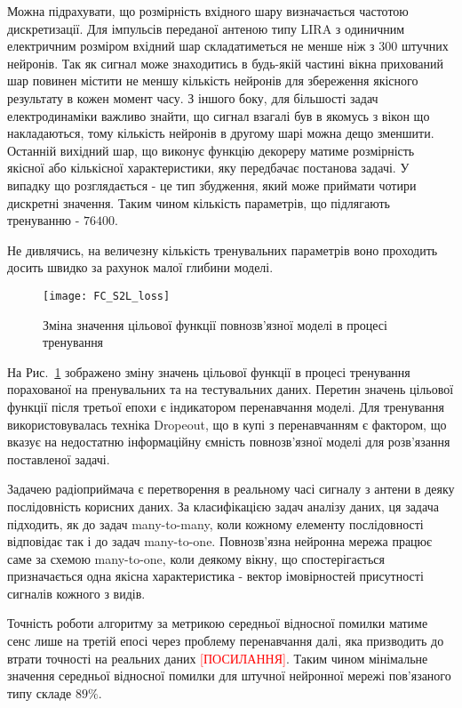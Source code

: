 Можна підрахувати, що розмірність вхідного шару визначається частотою 
дискретизації. Для імпульсів переданої антеною типу LIRA з одиничним 
електричним розміром вхідний шар складатиметься не менше ніж з 300 штучних 
нейронів. Так як сигнал може знаходитись в будь-якій частині вікна прихований 
шар повинен містити не меншу кількість нейронів для збереження якісного 
результату в кожен момент часу. З іншого боку, для більшості задач 
електродинаміки важливо знайти, що сигнал взагалі був в якомусь з вікон
що накладаються, тому кількість нейронів в другому шарі можна дещо зменшити.
Останній вихідний шар, що виконує функцію декореру матиме розмірність 
якісної або кількісної характеристики, яку передбачає постанова задачі.
У випадку що розглядається - це тип збудження, який може приймати чотири 
дискретні значення. Таким чином кількість параметрів, що підлягають 
тренуванню - $ 76400 $.

Не дивлячись, на величезну кількість тренувальних параметрів воно проходить 
досить швидко за рахунок малої глибини моделі.

\begin{figure}[htbp] \begin{center}
\texttt{[image: FC\_S2L\_loss]}
\caption{Зміна значення цільової функції повнозв'язної моделі  
в процесі тренування} \label{fig:fcnn_loss}
\end{center} \end{figure}

На Рис.~\ref{fig:fcnn_loss} зображено зміну значень цільової функції в 
процесі тренування порахованої на пренувальних та на тестувальних даних.
Перетин значень цільової функції після третьої епохи є індикатором 
перенавчання моделі. Для тренування використовувалась техніка Dropeout, 
що в купі з перенавчанням є фактором, що вказує на недостатню інформаційну
ємність повнозв'язної моделі для розв'язання поставленої задачі.

Задачею радіоприймача є перетворення в реальному часі сигналу з антени в 
деяку послідовність корисних даних. За класифікацією задач аналізу даних, 
ця задача підходить, як до задач many-to-many, коли кожному елементу 
послідовності відповідає так і до задач many-to-one. Повнозв'язна нейронна
мережа працює саме за схемою many-to-one, коли деякому вікну, що 
спостерігається призначається одна якісна характеристика -
вектор імовірностей присутності сигналів кожного з видів.

Точність роботи алгоритму за метрикою середньої відносної помилки
матиме сенс лише на третій епосі через проблему перенавчання далі, яка 
призводить до втрати точності на реальних даних \textcolor{red}{[ПОСИЛАННЯ]}. 
Таким чином мінімальне значення середньої відносної помилки для штучної 
нейронної мережі пов'язаного типу складе $ 89 \% $.

